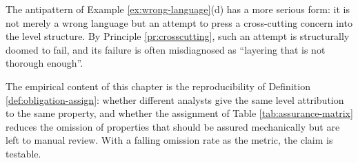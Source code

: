 The antipattern of Example \ref{ex:wrong-language}(d) has a more serious form: it is not
merely a wrong language but an attempt to press a cross-cutting concern into the level
structure. By Principle \ref{pr:crosscutting}, such an attempt is structurally doomed to fail,
and its failure is often misdiagnosed as ``layering that is not thorough enough''.

The empirical content of this chapter is the reproducibility of
Definition \ref{def:obligation-assign}: whether different analysts give the same level
attribution to the same property, and whether the assignment of
Table \ref{tab:assurance-matrix} reduces the omission of properties that should be assured
mechanically but are left to manual review. With a falling omission rate as the metric,
the claim is testable.
